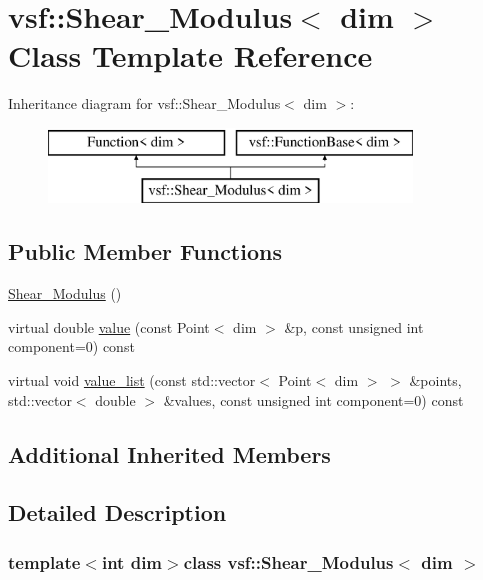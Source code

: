 \hypertarget{classvsf_1_1Shear__Modulus}{\section{vsf\-:\-:Shear\-\_\-\-Modulus$<$ dim $>$ Class Template Reference}
\label{classvsf_1_1Shear__Modulus}
}
Inheritance diagram for vsf\-:\-:Shear\-\_\-\-Modulus$<$ dim $>$\-:\begin{figure}[H]
\begin{center}
\leavevmode
\includegraphics[height=2.000000cm]{classvsf_1_1Shear__Modulus}
\end{center}
\end{figure}
\subsection*{Public Member Functions}
\begin{DoxyCompactItemize}
\item 
\hyperlink{classvsf_1_1Shear__Modulus_a00275a013eac84ac1cce403d183f2488}{Shear\-\_\-\-Modulus} ()
\item 
virtual double \hyperlink{classvsf_1_1Shear__Modulus_a914f7afda36d3cfa6e80563f8b7444cc}{value} (const Point$<$ dim $>$ \&p, const unsigned int component=0) const 
\item 
virtual void \hyperlink{classvsf_1_1Shear__Modulus_a01a61b73422dbb0819ac993b97739afb}{value\-\_\-list} (const std\-::vector$<$ Point$<$ dim $>$ $>$ \&points, std\-::vector$<$ double $>$ \&values, const unsigned int component=0) const 
\end{DoxyCompactItemize}
\subsection*{Additional Inherited Members}


\subsection{Detailed Description}
\subsubsection*{template$<$int dim$>$class vsf\-::\-Shear\-\_\-\-Modulus$<$ dim $>$}

